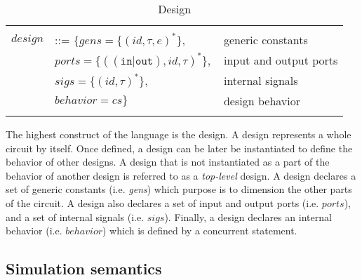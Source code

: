 \begin{table}[!htbp]
  \caption{Design}
  \label{tab:design}
  \begin{tabular}{|rll|}
    \hline
    & & \\
    $design$ & ::= $\{{}gens=\{(id,\tau,e)^{*}\},$ & generic constants \\
    & \quad\quad${}ports=\{((\mathtt{in}\vert\mathtt{out}),id,\tau)^{*}\},$ & input and output ports \\
    & \quad\quad${}sigs=\{(id,\tau)^{*}\},$ & internal signals \\
    & \quad\quad${}behavior=cs\}$ & design behavior \\
    & & \\
    \hline
  \end{tabular}
\end{table}

The highest construct of the \hvhdl{} language is the design. A design
represents a whole circuit by itself. Once defined, a design can be
later be instantiated to define the behavior of other designs. A
design that is not instantiated as a part of the behavior of another
design is referred to as a \textit{top-level} design. A design
declares a set of generic constants (i.e. \textit{gens}) which purpose
is to dimension the other parts of the circuit. A design also declares
a set of input and output ports (i.e. $ports$), and a set of internal
signals (i.e. $sigs$). Finally, a design declares an internal behavior
(i.e. $behavior$) which is defined by a concurrent statement.


\subsection{Simulation semantics}
\label{subsec:sim-semantics}

